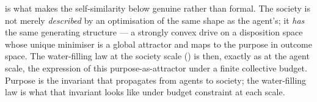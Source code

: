 \documentclass[11pt,twocolumn,a4paper]{article}
\begin{document}
\begin{remark}
\label{rem:purpose-propagates}
 is what makes the self-similarity below genuine
rather than formal. The society is not merely \emph{described} by an
optimisation of the same shape as the agent's; it \emph{has} the same
generating structure --- a strongly convex drive on a disposition space
whose unique minimiser is a global attractor and maps to the purpose in
outcome space. The water-filling law at the society scale ()
is then, exactly as at the agent scale, the expression of this
purpose-as-attractor under a finite collective budget. Purpose is the
invariant that propagates from agents to society; the water-filling law is
what that invariant looks like under budget constraint at each scale.
\end{remark}
\end{document}
